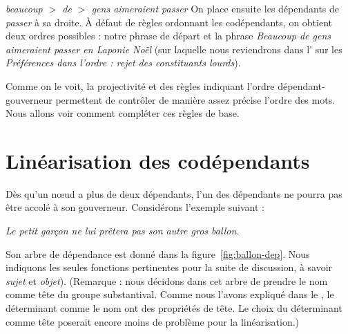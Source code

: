 \ea
    \textit{{beaucoup $>$ de $>$ gens aimeraient passer}}
\z
On place ensuite les dépendants de \textit{passer} à sa droite. À défaut de règles ordonnant les codépendants, on obtient deux ordres possibles : notre phrase de départ et la phrase \textit{Beaucoup de gens aimeraient passer en Laponie Noël} (sur laquelle nous reviendrons dans l’ sur les \textit{Préférences dans l’ordre : rejet des constituants lourds}).

Comme on le voit, la projectivité et des règles indiquant l’ordre dépendant-gouverneur permettent de contrôler de manière assez précise l’ordre des mots. Nous allons voir comment compléter ces règles de base.

\section{Linéarisation des codépendants}\label{sec:3.5.19}

Dès qu’un nœud a plus de deux dépendants, l’un des dépendants ne pourra pas être accolé à son gouverneur. Considérons l’exemple suivant :

\ea\label{ex:ballon}
\textit{{Le petit garçon ne lui prêtera pas son autre gros ballon}.}
\z

Son arbre de dépendance est donné dans la figure~\ref{fig:ballon-dep}. Nous indiquons les seules fonctions pertinentes pour la suite de discussion, à savoir \textit{sujet} et \textit{objet}).
 (Remarque : nous décidons dans cet arbre de prendre le nom comme tête du groupe substantival. Comme nous l’avons expliqué dans le , le déterminant comme le nom ont des propriétés de tête. Le choix du déterminant comme tête poserait encore moins de problème pour la linéarisation.)

